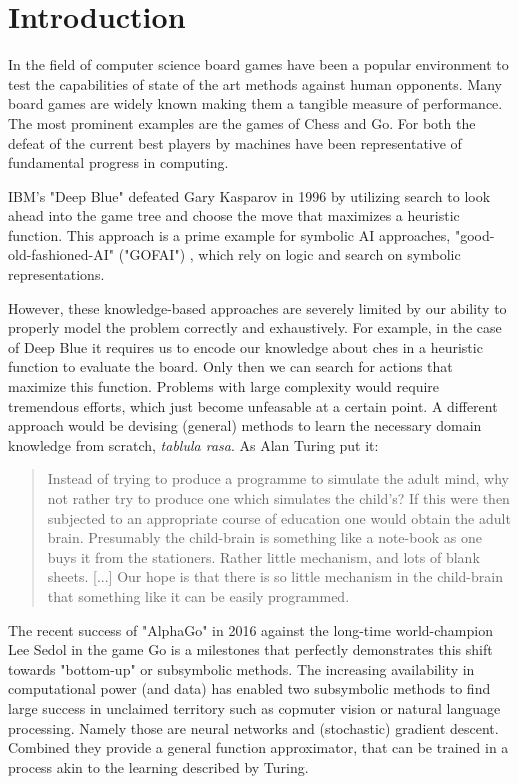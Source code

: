 \chapter{Introduction}

In the field of computer science board games have been a popular environment to test the capabilities of state of the art methods against human opponents. Many board games are widely known making them a tangible measure of performance. The most prominent examples are the games of Chess and Go. For both the defeat of the current best players by machines have been representative of fundamental progress in computing.

IBM's "Deep Blue" defeated Gary Kasparov in 1996 \cite{higgins_brief_2017} by utilizing search to look ahead into the game tree and choose the move that maximizes a heuristic function. This approach is a prime example for symbolic AI approaches, "good-old-fashioned-AI" ("GOFAI") \cite{haugeland_artificial_1985}, which rely on logic and search on symbolic representations.

However, these knowledge-based approaches are severely limited by our ability to properly model the problem correctly and exhaustively. For example, in the case of Deep Blue it requires us to encode our knowledge about ches in a heuristic function to evaluate the board. Only then we can search for actions that maximize this function. Problems with large complexity would require tremendous efforts, which just become unfeasable at a certain point. A different approach would be devising (general) methods to learn the necessary domain knowledge from scratch,  \emph{tablula rasa}. As Alan Turing put it:

\begin{quote}
    Instead of trying to produce a programme to simulate the adult mind, why not rather try to produce one which simulates the child’s? If this were then subjected to an appropriate course of education one would obtain the adult brain. Presumably the child-brain is something like a note-book as one buys it from the stationers. Rather little mechanism, and lots of blank sheets. [...] Our hope is that there is so little mechanism in the child-brain that something like it can be easily programmed.
    \cite{turing_icomputing_1950}
\end{quote}

The recent success of "AlphaGo" in 2016 against the long-time world-champion Lee Sedol \cite{deepmind_match_nodate} in the game Go is a milestones that perfectly demonstrates this shift towards "bottom-up" or subsymbolic methods. \cite{nilsson_artificial_1998} The increasing availability in computational power (and data) has enabled two subsymbolic methods to find large success in unclaimed territory such as copmuter vision or natural language processing. Namely those are neural networks and (stochastic) gradient descent. Combined they provide a general function approximator, that can be trained in a process akin to the learning described by Turing.

